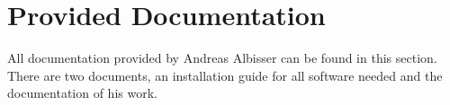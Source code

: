 \chapter{Provided Documentation} \label{app:DocumentationAndreasAlbisser}
All documentation provided by Andreas Albisser can be found in this section. There are two documents, an installation guide for all software needed and the documentation of his work.

